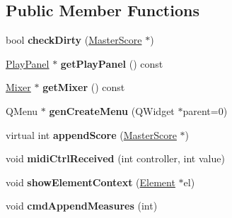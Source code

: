 \subsection*{Public Member Functions}
\begin{DoxyCompactItemize}
\item 
\mbox{\label{class_ms_1_1_muse_score_ad0908b5fabd95047781ea9a177f5911a}} 
bool {\bfseries check\+Dirty} (\hyperlink{class_ms_1_1_master_score}{Master\+Score} $\ast$)
\item 
\mbox{\label{class_ms_1_1_muse_score_a618883431b8ad01ee438d9de76f841b6}} 
\hyperlink{class_ms_1_1_play_panel}{Play\+Panel} $\ast$ {\bfseries get\+Play\+Panel} () const
\item 
\mbox{\label{class_ms_1_1_muse_score_a92072aa0dfb0709ac13039b19c7a195a}} 
\hyperlink{class_ms_1_1_mixer}{Mixer} $\ast$ {\bfseries get\+Mixer} () const
\item 
\mbox{\label{class_ms_1_1_muse_score_a9b6bf305429beeb8391c798b7bacdd86}} 
Q\+Menu $\ast$ {\bfseries gen\+Create\+Menu} (Q\+Widget $\ast$parent=0)
\item 
\mbox{\label{class_ms_1_1_muse_score_afb97d9725e0df1b3e1e23528f2745daa}} 
virtual int {\bfseries append\+Score} (\hyperlink{class_ms_1_1_master_score}{Master\+Score} $\ast$)
\item 
\mbox{\label{class_ms_1_1_muse_score_a06056f52d14f19ef58f44a4ded5cce86}} 
void {\bfseries midi\+Ctrl\+Received} (int controller, int value)
\item 
\mbox{\label{class_ms_1_1_muse_score_a3fd5e03ad52bf7bf7edd2cfe8ac1b77d}} 
void {\bfseries show\+Element\+Context} (\hyperlink{class_ms_1_1_element}{Element} $\ast$el)
\item 
\mbox{\label{class_ms_1_1_muse_score_a4b25f14b6e254d4523622af655f29a7b}} 
void {\bfseries cmd\+Append\+Measures} (int)
\item 
\mbox{\label{class_ms_1_1_muse_score_a781a3cb9ead6105990a7817f8991c18e}} 

\end{DoxyCompactItemize}
